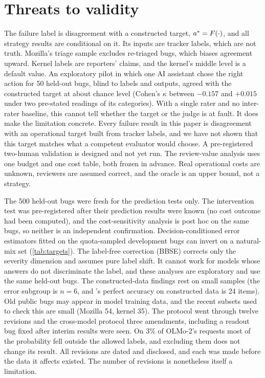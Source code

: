 \section{Threats to validity}
\label{sec:threats}

 The failure label is disagreement with a
constructed target, $a^{*} = F(\cdot)$, and all strategy results are
conditional on it. Its inputs are tracker labels, which are not truth.
Mozilla's triage sample excludes re-triaged bugs, which biases agreement
upward. Kernel labels are reporters' claims, and the kernel's middle
level is a default value. An exploratory pilot in which one AI assistant
chose the right action for 50 held-out bugs, blind to labels and outputs,
agreed with the constructed target at about chance level (Cohen's
$\kappa$ between $-0.157$ and $+0.015$ under two pre-stated readings of
its categories). With a single rater and no inter-rater baseline, this
cannot tell whether the target or the judge is at fault. It does make
the limitation concrete. Every failure result in this paper is
disagreement with an operational target built from tracker labels, and
we have not shown that this target matches what a competent evaluator
would choose. A pre-registered two-human validation is designed and not
yet run. The review-value analysis uses one budget and one cost table,
both frozen in advance. Real operational costs are unknown, reviewers
are assumed correct, and the oracle is an upper bound, not a strategy.

 The 500 held-out bugs were fresh for the
prediction tests only. The intervention test was pre-registered after
their prediction results were known (no cost outcome had been computed),
and the cost-sensitivity analysis is post hoc on the same bugs, so
neither is an independent confirmation. Decision-conditioned error
estimators fitted on the quota-sampled development bugs can invert on a
natural-mix set (\cref{tab:targets}). The label-free correction (BBSE)
corrects only the severity dimension and assumes pure label shift. It
cannot work for models whose answers do not discriminate the label, and
these analyses are exploratory and use the same held-out bugs. The
constructed-data findings rest on small samples (the \choice{} error
subgroup is $n = 6$, and \noul{}'s perfect accuracy on constructed data
is 24 items). Old public bugs may appear in model training data, and the
recent subsets used to check this are small (Mozilla 54, kernel 35). The
protocol went through twelve revisions and the cross-model protocol
three amendments, including a readout bug fixed after interim results
were seen. On 3\% of OLMo-2's requests most of the probability fell
outside the allowed labels, and excluding them does not change its
result. All revisions are dated and disclosed, and each was made before
the data it affects existed. The number of revisions is nonetheless
itself a limitation.

